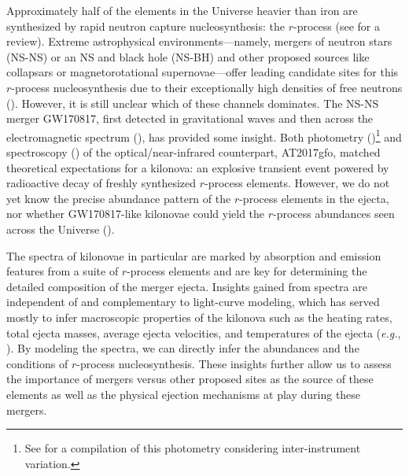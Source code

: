 \documentclass[twocolumn,twocolappendix]{aastex63}
\def\eg{{\it e.g.}}
\begin{document}
Approximately half of the elements in the Universe heavier than iron are synthesized by rapid neutron capture nucleosynthesis: the $r$-process (see \citealt{cowan21} for a review). Extreme astrophysical environments---namely, mergers of neutron stars (NS-NS) or an NS and black hole (NS-BH) and other proposed sources like collapsars or magnetorotational supernovae---offer leading candidate sites for this $r$-process nucleosynthesis due to their exceptionally high densities of free neutrons (\citealt{lattimer74, symbalisty82, eichler89, freiburghaus99, goriely11, korobkin12, bauswein13}). However, it is still unclear which of these channels dominates. The NS-NS merger GW170817, first detected in gravitational waves and then across the electromagnetic spectrum (\citealt{abbottLIGO17a, abbottLIGO17b}), has provided some insight. Both photometry (\citealt{andreoni17, arcavi17, coulter17, diaz17, drout17, evans17, hu17, kasliwal17, lipunov17, tanvir17, troja17, utsumi17, valenti17})\footnote{See \cite{villar17} for a compilation of this photometry considering inter-instrument variation.} and spectroscopy (\citealt{chornock17, kasen17, pian17, shappee17, smartt17}) of the optical/near-infrared counterpart, AT2017gfo, matched theoretical expectations for a kilonova: an explosive transient event powered by radioactive decay of freshly synthesized $r$-process elements. However, we do not yet know the precise abundance pattern of the $r$-process elements in the ejecta, nor whether GW170817-like kilonovae could yield the $r$-process abundances seen across the Universe (\citealt{ji19, cowan21}).

The spectra of kilonovae in particular are marked by absorption and emission features from a suite of $r$-process elements and are key for determining the detailed composition of the merger ejecta. Insights gained from spectra are independent of and complementary to light-curve modeling, which has served mostly to infer macroscopic properties of the kilonova such as the heating rates, total ejecta masses, average ejecta velocities, and temperatures of the ejecta (\eg, \citealt{villar17, almualla21, breschi21, ristic22}). By modeling the spectra, we can directly infer the abundances and the conditions of $r$-process nucleosynthesis. These insights further allow us to assess the importance of mergers versus other proposed sites as the source of these elements as well as the physical ejection mechanisms at play during these mergers. 
\end{document}
